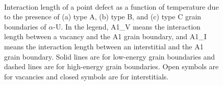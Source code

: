 \documentclass[review]{elsarticle}
\begin{document}
\begin{figure}[h!]
\centering
{}
\\
\caption{Interaction length of a point defect as a function of temperature due to the presence of (a) type A, (b) type B, and (c) type C grain boundaries of $\alpha$-U. In the legend, A1\_V means the interaction length between a vacancy and the A1 grain boundary, and A1\_I means the interaction length between an interstitial and the A1 grain boundary. Solid lines are for low-energy grain boundaries and dashed lines are for high-energy grain boundaries. Open symbols are for vacancies and closed symbols are for interstitials.}
\label{fig:Int}
\end{figure}
\end{document}
